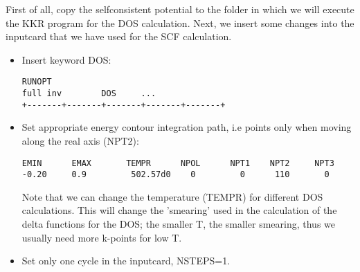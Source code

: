 \documentclass[11pt,fleqn]{book} %
\begin{document}
First of all, copy the selfconsistent potential to the folder in which we
will execute the KKR program for the DOS calculation.
Next, we insert some changes into the inputcard that we have used
for the SCF calculation.

\begin{itemize}

\item Insert keyword DOS:
\begin{VBox}
\begin{verbatim}
RUNOPT
full inv        DOS     ...
+-------+-------+-------+-------+-------+
\end{verbatim}
\end{VBox}

\item Set appropriate energy contour integration path, i.e points only
when moving along the real axis (NPT2):
\begin{VBox}
\begin{verbatim}
EMIN      EMAX       TEMPR      NPOL      NPT1    NPT2     NPT3
-0.20     0.9         502.57d0    0         0      110       0
\end{verbatim}
\end{VBox}
Note that we can change the temperature (TEMPR) for different DOS calculations.
This will change the 'smearing' used in the calculation of the delta functions
for the DOS; the smaller T, the smaller smearing, thus we usually need more
k-points for low T.

\item Set only one cycle in the inputcard, NSTEPS=1.

\end{itemize}
\end{document}

